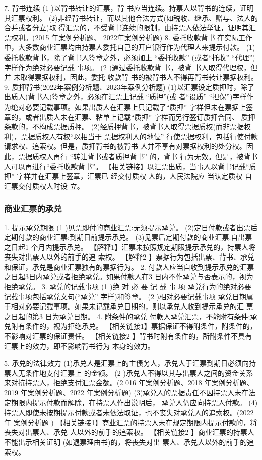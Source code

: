 \documentclass[UTF8,12pt]{ctexart}
\numberwithin{equation}{section} %
\numberwithin{figure}{section}
\numberwithin{table}{section}
\begin{document}
	7. 背书连续
	(1 )以背书转让的汇票，背 书应当连续。持票人以背书的连续，证明其汇票权利。 (2)非经背书转让，而以其他合法方式(如税收、继承、赠与、法人的合并或者分立)取 得汇票的，不受背书连续的限制，由持票人依法举证，证明其汇票权利。(2015 年案例分析题、 2022年案例分析题)
	8. 委托收款背书 在实际工作中，大多数商业汇票均由持票人委托自己的开户银行作为代理人来提示付款。 (1)委托收款背书，除了背书人签章之外，必须加上 “委托收款” (或者“托收” “代理”) 字样作为绝对必要记载 事项。
	(2 )通过委托收款背 书，被背 书人取得代理权，但并 未取得票据权利，因此，委托 收款背 书的被背书人不得再背书转让票据权利。
	9. 质押背书(2022年案例分析题、2023年案例分析题) (1)以汇票设定质押时，除了出质人(背书人)签章之外，必须在汇票上记载 “质押”(或 者“设质” “担保”)字样作为绝对必要记载事项。如果出质人在汇票上只记载了“质押” 字样但未在票据上签章的，或者出质人未在汇票、粘单上记载“质押” 字样而另行签订质押合同、 质押条款的，不构成票据质押。 (2)经质押背书，被背书人取得票据质权(而非票据权利)，票据质权人有权“以相当于 票据权利人的地位” 行使票据权利，包括行使付款请求权、追索权。但是，质押背书的被背书 人并不享有对票据权利的处分权。因此，票据质权人再行 “转让背书或者质押背书” 的，背书 行为无效。但是，被背书人可以再进行“委托收款背书”。 【相关链接】以汇票出质，当事人以背书记载“质押” 字样并在汇票上签章，汇票已 经交付质权 人的，人民法院应 当认定质权 自汇票交付质权人时设 立。
	
	\subsubsection{商业汇票的承兑} 
	1. 提示承兑期限
	(1 )见票即付的商业汇票:无须提示承兑。 (2)定日付款或者出票后定期付款的商业汇票:到期日前提示承兑。 (3)见票后定期付款的商业汇票:自出票之日起1 个月内提示承兑。
	【解释1】汇票未按照规定期限提示承兑的，持票人将丧失对出票人以外的前手的追 索权。
	【解释2 】票据行为包括出票、背书、承兑和保证，承兑是商业汇票独有的票据行为。
	2. 付款人应当自收到提示承兑的汇票之日起3日内承兑或者拒绝承兑。如果付款人在3 日内不作承兑与否表示的，视为拒绝承兑。
	3. 承兑的记载事项
	(1 )绝 对 必 要 记 载 事 项
	承兑行为的绝对必要记载事项包括承兑文句(“承兑” 字样)和签章。
	(2 )相对必要记载事项 承兑日期属于相对必要记载事项。如果未记载承兑日期的，则以承兑人收到提示承兑的汇 票之日起的第3 日为承兑日期。
	4. 附条件的承兑
	付款人承兑汇票，不能附有条件;承兑附有条件的，视为拒绝承兑。
	【相关链接1】票据保证不得附条件，附条件的，不影响对汇票的保证责任。 【相关链接2 】背书时附有条件的，所附条件不具有汇票上的效力，即不影响背书行为 本身的效力。
	
	5. 承兑的法律效力 (1)承兑人是汇票上的主债务人，承兑人于汇票到期日必须向持票人无条件地支付汇票上 的金额。
	(2 )承兑人不得以其与出票人之间的资金关系来对抗持票人，拒绝支付汇票金额。(2 016 年案例分析题、2018 年案例分析题、2019 年案例分析题、2022 年案例分析题) (3)承兑人的票据责任不因持票人未在法定期限内提示付款而解除，在持票人作出说明后， 承兑人仍应向持票人付款。 (4)持票人即使未按期提示付款或者未依法取证，也不丧失对承兑人的追索权。(2022 年 案例分析题 )
	【相关链接1】商业汇票的持票人未在规定期限内提示付款的，将丧失对出票人、承兑 人以外的前手的追索权。
	【相关链接2 】商业汇票的持票人不能出示相关证明 (如退票理由书)的，将丧失对出 票人、承兑人以外的前手的追索权。
	
\end{document}
